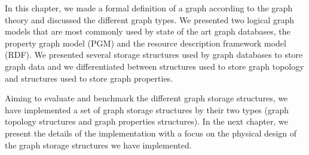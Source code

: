 {In this chapter, we made a formal definition of a graph according to the graph theory and discussed the different graph types. We presented two logical graph models that are most commonly used  by state of the art graph databases, the property graph model (PGM) and the resource description framework model (RDF). We presented several storage structures used by graph databases to store graph data and we differentiated between structures used to store graph topology and structures used to store graph properties.

Aiming to evaluate and benchmark the different graph storage structures, we have implemented a set of graph storage structures by their two types (graph topology structures and graph properties structures). In the next chapter, we present the details of the implementation with a focus on the physical design of the graph storage structures we have implemented.

}